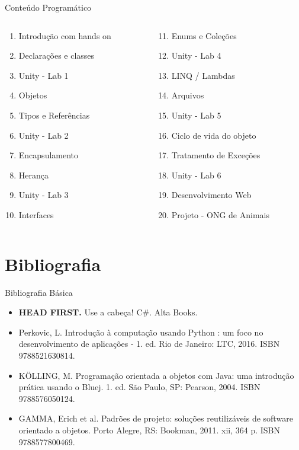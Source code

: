 \documentclass[aspectratio=169]{beamer}
\begin{document}
\begin{frame}{Conteúdo Programático}
\begin{columns}
\begin{column}{0.5\textwidth}
\begin{enumerate}
    \item Introdução com hands on
    \item Declarações e classes
    \item Unity - Lab 1
    \item Objetos
    \item Tipos e Referências
    \item Unity - Lab 2
    \item Encapsulamento
    \item Herança
    \item Unity - Lab 3
    \item Interfaces
\end{enumerate}
\end{column}
\begin{column}{0.5\textwidth}
\begin{enumerate}
    \setcounter{enumi}{10}
    \item Enums e Coleções
    \item Unity - Lab 4
    \item LINQ / Lambdas
    \item Arquivos
    \item Unity - Lab 5
    \item Ciclo de vida do objeto
    \item Tratamento de Exceções
    \item Unity - Lab 6
    \item Desenvolvimento Web
    \item Projeto - ONG de Animais
\end{enumerate}
\end{column}
\end{columns}
\end{frame}

\section{Bibliografia}

\begin{frame}{Bibliografia Básica}
\begin{itemize}
    \item \textbf{HEAD FIRST.} Use a cabeça! C\#. Alta Books.
    \item Perkovic, L. Introdução à computação usando Python : um foco no desenvolvimento de aplicações - 1. ed. Rio de Janeiro: LTC, 2016. ISBN 9788521630814.
    \item KÖLLING, M. Programação orientada a objetos com Java: uma introdução prática usando o Bluej. 1. ed. São Paulo, SP: Pearson, 2004. ISBN 9788576050124.
    \item GAMMA, Erich et al. Padrões de projeto: soluções reutilizáveis de software orientado a objetos. Porto Alegre, RS: Bookman, 2011. xii, 364 p. ISBN 9788577800469.
\end{itemize}
\end{frame}
\end{document}
